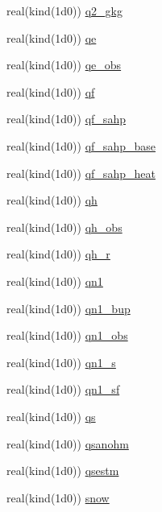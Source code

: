 \begin{DoxyCompactItemize}
real(kind(1d0)) \hyperlink{namespacedata__in_a56c3960c55d29dadfd4d6be5ec53cc3c}{q2\+\_\+gkg}
\item 
real(kind(1d0)) \hyperlink{namespacedata__in_a15dff170cc3ed5a26f5b095eebf80392}{qe}
\item 
real(kind(1d0)) \hyperlink{namespacedata__in_a89bbf8e5d0059c1005799182e4f5f703}{qe\+\_\+obs}
\item 
real(kind(1d0)) \hyperlink{namespacedata__in_a13eb3e18ed56b78668ba6c47d11ba155}{qf}
\item 
real(kind(1d0)) \hyperlink{namespacedata__in_a3bdf6ad52d92cd85f212cea607807601}{qf\+\_\+sahp}
\item 
real(kind(1d0)) \hyperlink{namespacedata__in_a717a1dc537f7b213fc70eb8f51819542}{qf\+\_\+sahp\+\_\+base}
\item 
real(kind(1d0)) \hyperlink{namespacedata__in_a3606d0dc641d4f68851d608bec320422}{qf\+\_\+sahp\+\_\+heat}
\item 
real(kind(1d0)) \hyperlink{namespacedata__in_ade512e4aad4c64404e1c974241c965e7}{qh}
\item 
real(kind(1d0)) \hyperlink{namespacedata__in_a333bca61a59b05a5a5db0c7bb9daa2b9}{qh\+\_\+obs}
\item 
real(kind(1d0)) \hyperlink{namespacedata__in_a7144dc07db9d95f72aedabd88c44bf99}{qh\+\_\+r}
\item 
real(kind(1d0)) \hyperlink{namespacedata__in_ae6fa09bb6b28e70653d0957e003b6f57}{qn1}
\item 
real(kind(1d0)) \hyperlink{namespacedata__in_a7c4bf0a5d9721f577e74c835d3513036}{qn1\+\_\+bup}
\item 
real(kind(1d0)) \hyperlink{namespacedata__in_ae357494342c4cf48a962c4361d7c4459}{qn1\+\_\+obs}
\item 
real(kind(1d0)) \hyperlink{namespacedata__in_ae21258de695f82699606f7ced498693d}{qn1\+\_\+s}
\item 
real(kind(1d0)) \hyperlink{namespacedata__in_af270ed598adad800b8338f7a0700183f}{qn1\+\_\+sf}
\item 
real(kind(1d0)) \hyperlink{namespacedata__in_aade22df4a22fe3872701ac9b6f7fed21}{qs}
\item 
real(kind(1d0)) \hyperlink{namespacedata__in_ac47d3ea5084c2019b69f3fe0b7ae4454}{qsanohm}
\item 
real(kind(1d0)) \hyperlink{namespacedata__in_a4c71a7e3c5a99b333e25a1876a3968b1}{qsestm}
\item 
real(kind(1d0)) \hyperlink{namespacedata__in_a4e7d05b463b07d80dfb5d3d65aea03e2}{snow}
\item 

\end{DoxyCompactItemize}
